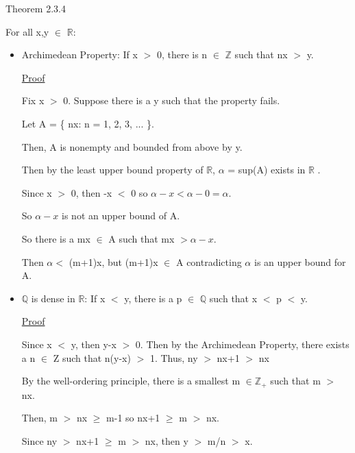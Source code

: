 {\color{red} Theorem 2.3.4}

	\qquad For all x,y $\in$ $ \mathbb{R} $:
	\begin{itemize}[leftmargin=1cm, itemsep=0.4em]
		\item {\color{lblue} Archimedean Property}:
			If x $>$ 0, there is n $\in$ $ \mathbb{Z} $ such that nx $>$ y.
	
			{ \color{magenta} \underline{Proof} }

				Fix x $>$ 0. Suppose there is a y such that the property fails.

				Let A = \{ nx: n = 1, 2, 3, ... \}.

				Then, A is nonempty and bounded from above by y.

				Then by the least upper bound property of $ \mathbb{R} $,
				$\alpha$ = sup(A) exists in $ \mathbb{R} $ .

				Since x $>$ 0, then -x $<$ 0 so $\alpha - x < \alpha-0 = \alpha$.

				So $\alpha-x$ is not an upper bound of A.

				So there is a mx $\in$ A such that mx $> \alpha-x$.

				Then $\alpha <$ (m+1)x, but (m+1)x $\in$ A
				contradicting $\alpha$ is an upper bound for A.

		\item {\color{lblue} $ \mathbb{Q} $  is dense in $ \mathbb{R} $}:
			If x $<$ y, there is a p $\in$ $ \mathbb{Q} $ such that x $<$ p $<$ y.

			{ \color{magenta} \underline{Proof} }

				Since x $<$ y, then y-x $>$ 0. Then by the Archimedean Property,
				there exists a n $\in$ Z such that n(y-x) $>$ 1. Thus, ny $>$ nx+1 $>$ nx

				By the well-ordering principle, there is a smallest m $\in \mathbb{Z_+} $
				such that m $>$ nx.

				Then, m $>$ nx $\geq$ m-1 so nx+1 $\geq$ m $>$ nx.

				Since ny $>$ nx+1 $\geq$ m $>$ nx, then y $>$ m/n $>$ x.
\end{itemize}
